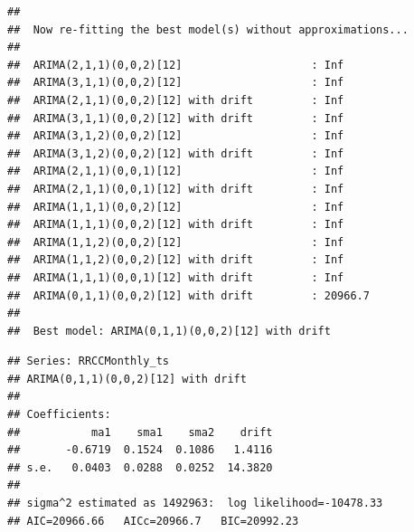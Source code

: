 \documentclass[12pt,]{article}
\newenvironment{Shaded}{\begin{snugshade}}{\end{snugshade}}
\newcommand{\CommentTok}[1]{\textcolor[rgb]{0.56,0.35,0.01}{\textit{#1}}}
\newcommand{\DataTypeTok}[1]{\textcolor[rgb]{0.13,0.29,0.53}{#1}}
\newcommand{\DecValTok}[1]{\textcolor[rgb]{0.00,0.00,0.81}{#1}}
\newcommand{\KeywordTok}[1]{\textcolor[rgb]{0.13,0.29,0.53}{\textbf{#1}}}
\newcommand{\NormalTok}[1]{#1}
\newcommand{\OperatorTok}[1]{\textcolor[rgb]{0.81,0.36,0.00}{\textbf{#1}}}
\newcommand{\StringTok}[1]{\textcolor[rgb]{0.31,0.60,0.02}{#1}}
\begin{document}
\begin{verbatim}
## 
##  Now re-fitting the best model(s) without approximations...
## 
##  ARIMA(2,1,1)(0,0,2)[12]                    : Inf
##  ARIMA(3,1,1)(0,0,2)[12]                    : Inf
##  ARIMA(2,1,1)(0,0,2)[12] with drift         : Inf
##  ARIMA(3,1,1)(0,0,2)[12] with drift         : Inf
##  ARIMA(3,1,2)(0,0,2)[12]                    : Inf
##  ARIMA(3,1,2)(0,0,2)[12] with drift         : Inf
##  ARIMA(2,1,1)(0,0,1)[12]                    : Inf
##  ARIMA(2,1,1)(0,0,1)[12] with drift         : Inf
##  ARIMA(1,1,1)(0,0,2)[12]                    : Inf
##  ARIMA(1,1,1)(0,0,2)[12] with drift         : Inf
##  ARIMA(1,1,2)(0,0,2)[12]                    : Inf
##  ARIMA(1,1,2)(0,0,2)[12] with drift         : Inf
##  ARIMA(1,1,1)(0,0,1)[12] with drift         : Inf
##  ARIMA(0,1,1)(0,0,2)[12] with drift         : 20966.7
## 
##  Best model: ARIMA(0,1,1)(0,0,2)[12] with drift
\end{verbatim}

\begin{verbatim}
## Series: RRCCMonthly_ts 
## ARIMA(0,1,1)(0,0,2)[12] with drift 
## 
## Coefficients:
##           ma1    sma1    sma2    drift
##       -0.6719  0.1524  0.1086   1.4116
## s.e.   0.0403  0.0288  0.0252  14.3820
## 
## sigma^2 estimated as 1492963:  log likelihood=-10478.33
## AIC=20966.66   AICc=20966.7   BIC=20992.23
\end{verbatim}

\begin{Shaded}
\end{Shaded}
\end{document}
